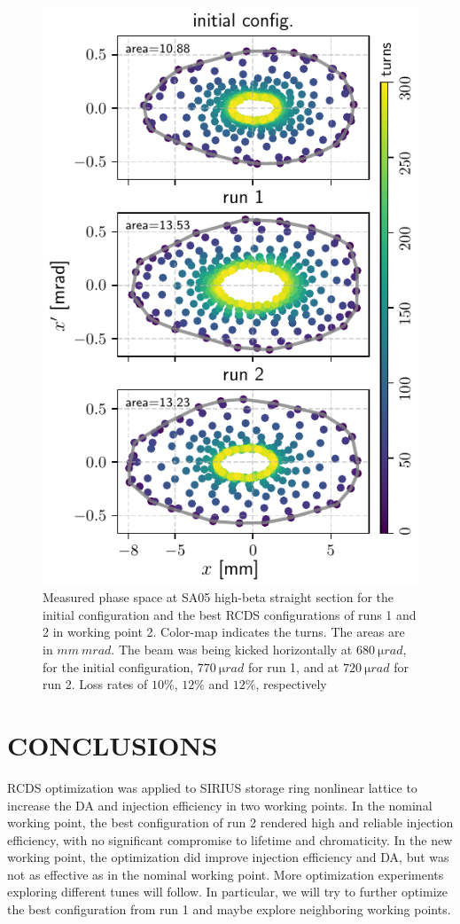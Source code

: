 \documentclass[a4paper,
               keeplastbox,   %
               ]{jacow}
\begin{document}
\begin{figure}
   \includegraphics[width=\columnwidth]{WEPL087_f4.pdf}
   \caption{Measured phase space at SA05 high-beta straight section for the initial configuration and the best RCDS configurations of runs 1 and 2 in working point 2. Color-map indicates the turns. The areas are in $\unit{mm}~\unit{mrad}$. The beam was being kicked horizontally at $680~\unit{\micro rad}$, for the initial configuration, $770~\unit{\micro rad}$ for run 1, and at $720~\unit{\micro rad}$ for run 2. Loss rates of $10\%$, $12\%$ and $12\%$, respectively}
   \label{fig:newtunes_phase}
\end{figure}
\section{CONCLUSIONS}
RCDS optimization was applied to SIRIUS storage ring nonlinear lattice to increase the DA and injection efficiency in two working points. In the nominal working point, the best configuration of run 2 rendered high and reliable injection efficiency, with no significant compromise to lifetime and chromaticity. In the new working point, the optimization did improve injection efficiency and DA, but was not as effective as in the nominal working point. More optimization experiments exploring different tunes will follow. In particular, we will try to further optimize the best configuration from run 1 and maybe explore neighboring working points.
\end{document}
